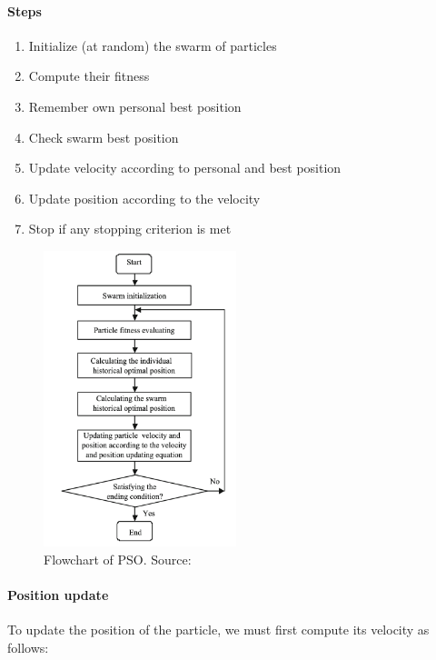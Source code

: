     \paragraph{Steps}
        \begin{enumerate}
            \item Initialize (at random) the swarm of particles
            \item Compute their fitness
            \item Remember own personal best position
            \item Check swarm best position
            \item Update velocity according to personal and best position
            \item Update position according to the velocity
            \item Stop if any stopping criterion is met 
        \end{enumerate}

        \begin{figure}[H]
            \centering
            \includegraphics[width=0.5\textwidth]{img/pso.png}
            \caption{Flowchart of PSO. Source: \cite{pso}}
        \end{figure}

    \paragraph{Position update}
        To update the position of the particle, we must first compute its velocity as follows:

